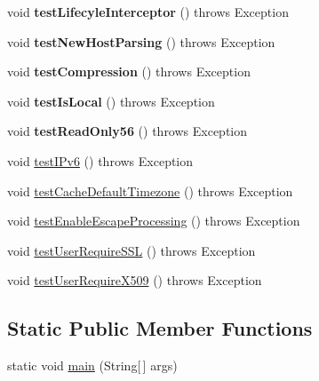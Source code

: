 \begin{DoxyCompactItemize}
\item 
\mbox{\label{classtestsuite_1_1simple_1_1_connection_test_ade9f97f7bb0875ac302b464bf8a00e40}} 
void {\bfseries test\+Lifecyle\+Interceptor} ()  throws Exception 
\item 
\mbox{\label{classtestsuite_1_1simple_1_1_connection_test_a2def0e0f5805bc123f27ecfaa3e1bbd7}} 
void {\bfseries test\+New\+Host\+Parsing} ()  throws Exception 
\item 
\mbox{\label{classtestsuite_1_1simple_1_1_connection_test_a22a442826a4f49a1fd5c67a310e296de}} 
void {\bfseries test\+Compression} ()  throws Exception 
\item 
\mbox{\label{classtestsuite_1_1simple_1_1_connection_test_ab0d2e15a6a5a5f0876ea643631a7ab96}} 
void {\bfseries test\+Is\+Local} ()  throws Exception 
\item 
\mbox{\label{classtestsuite_1_1simple_1_1_connection_test_afa59da66108d892d7a6b0f91775127a5}} 
void {\bfseries test\+Read\+Only56} ()  throws Exception 
\item 
void \mbox{\hyperlink{classtestsuite_1_1simple_1_1_connection_test_aaac71a7d7f1811f8ca555a3f8fb2573b}{test\+I\+Pv6}} ()  throws Exception 
\item 
void \mbox{\hyperlink{classtestsuite_1_1simple_1_1_connection_test_a88325894a5bef7fc0239d8af082ede7f}{test\+Cache\+Default\+Timezone}} ()  throws Exception 
\item 
void \mbox{\hyperlink{classtestsuite_1_1simple_1_1_connection_test_a64fec8e4893bf266e66b4f59ceeb323f}{test\+Enable\+Escape\+Processing}} ()  throws Exception 
\item 
void \mbox{\hyperlink{classtestsuite_1_1simple_1_1_connection_test_a0c148553019aa296f7f80dfc7edf1e49}{test\+User\+Require\+S\+SL}} ()  throws Exception 
\item 
void \mbox{\hyperlink{classtestsuite_1_1simple_1_1_connection_test_a8ccc3af85ebbc2d7b461b32b29d8982c}{test\+User\+Require\+X509}} ()  throws Exception 
\end{DoxyCompactItemize}
\subsection*{Static Public Member Functions}
\begin{DoxyCompactItemize}
\item 
static void \mbox{\hyperlink{classtestsuite_1_1simple_1_1_connection_test_a3f457b435e6cf75f31649400f2ce211d}{main}} (String\mbox{[}$\,$\mbox{]} args)
\end{DoxyCompactItemize}
